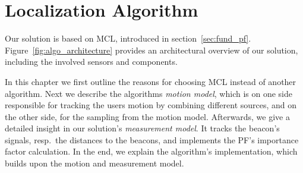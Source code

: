 \chapter{Localization Algorithm} \label{chap:pf}
Our solution is based on \acl{MCL}, introduced in section~\ref{sec:fund_pf}. Figure~\ref{fig:algo_architecture} provides an architectural overview of our solution, including the involved sensors and components.

In this chapter we first outline the reasons for choosing \acs{MCL} instead of another algorithm. Next we describe the algorithms \emph{motion model}, which is on one side responsible for tracking the users motion by combining different sources, and on the other side, for the sampling from the motion model. Afterwards, we give a detailed insight in our solution's \emph{measurement model}. It tracks the beacon's signals, resp.\ the distances to the beacons, and implements the \acs{PF}'s importance factor calculation. In the end, we explain the algorithm's implementation, which builds upon the motion and measurement model.

%

